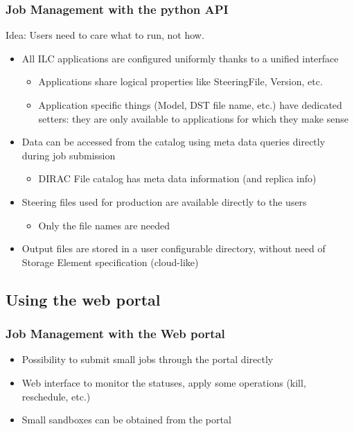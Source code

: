 \documentclass[10pt,table,dvipsnames]{beamer}
\begin{document}
\begin{frame}
  \frametitle{Job Management with the python API}
Idea: \alert{Users need to care what to run, not how.}
\begin{itemize}
\item All ILC applications are configured uniformly thanks to a unified interface
  \begin{itemize}
  \item Applications share logical properties like SteeringFile,
    Version, etc.
  \item Application specific things (Model, DST file name, etc.) have
    dedicated setters: they are only available to applications for
    which they make sense
  \end{itemize}
\item Data can be accessed from the catalog using meta data queries
  directly during job submission
  \begin{itemize}
  \item DIRAC File catalog has meta data information (and replica info)
  \end{itemize}
\item Steering files used for production are available directly to the
  users
  \begin{itemize}
  \item Only the file names are needed
  \end{itemize}
\item Output files are stored in a user configurable directory,
  without need of Storage Element specification (cloud-like)
\end{itemize}
\end{frame}

\subsection{Using the web portal}
\label{sec:web}

\begin{frame}
  \frametitle{Job Management with the Web portal}
  \begin{itemize}
  \item Possibility to submit small jobs through the portal directly
  \item Web interface to monitor the statuses, apply some operations
  (kill, reschedule, etc.)
\item Small sandboxes can be obtained from the portal
  \end{itemize}
\end{frame}
\end{document}
